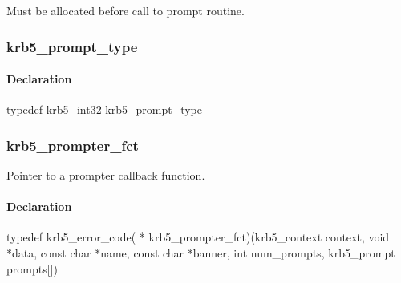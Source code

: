 \documentclass[letterpaper,10pt,english]{sphinxmanual}
\begin{document}

\begin{fulllineitems}
\label{appdev/refs/types/krb5_prompt:krb5_prompt.reply}
Must be allocated before call to prompt routine.

\end{fulllineitems}



\subsubsection{krb5\_prompt\_type}
\label{appdev/refs/types/krb5_prompt_type:krb5-prompt-type-struct}\label{appdev/refs/types/krb5_prompt_type:krb5-prompt-type}\label{appdev/refs/types/krb5_prompt_type::doc}

\begin{fulllineitems}
\label{appdev/refs/types/krb5_prompt_type:krb5_prompt_type}
\end{fulllineitems}



\paragraph{Declaration}
\label{appdev/refs/types/krb5_prompt_type:declaration}
typedef krb5\_int32 krb5\_prompt\_type


\subsubsection{krb5\_prompter\_fct}
\label{appdev/refs/types/krb5_prompter_fct:krb5-prompter-fct-struct}\label{appdev/refs/types/krb5_prompter_fct:krb5-prompter-fct}\label{appdev/refs/types/krb5_prompter_fct::doc}

\begin{fulllineitems}
\label{appdev/refs/types/krb5_prompter_fct:krb5_prompter_fct}
\end{fulllineitems}


Pointer to a prompter callback function.


\paragraph{Declaration}
\label{appdev/refs/types/krb5_prompter_fct:declaration}
typedef krb5\_error\_code( * krb5\_prompter\_fct)(krb5\_context context, void *data, const char *name, const char *banner, int num\_prompts, krb5\_prompt prompts{[}{]})
\end{document}
